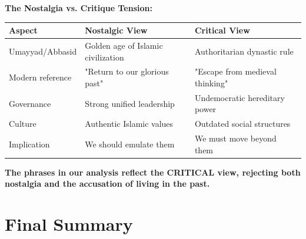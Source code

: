 \documentclass[letterpaper,12pt]{article}
\begin{document}
\begin{tcolorbox}[colback=white,colframe=accentcolor,breakable]
\textbf{The Nostalgia vs. Critique Tension:}

\begin{tabular}{|l|p{5cm}|p{5cm}|}
\hline
\textbf{Aspect} & \textbf{Nostalgic View} & \textbf{Critical View} \\
\hline
Umayyad/Abbasid & Golden age of Islamic civilization & Authoritarian dynastic rule \\
\hline
Modern reference & "Return to our glorious past" & "Escape from medieval thinking" \\
\hline
Governance & Strong unified leadership & Undemocratic hereditary power \\
\hline
Culture & Authentic Islamic values & Outdated social structures \\
\hline
Implication & We should emulate them & We must move beyond them \\
\hline
\end{tabular}

\textbf{The phrases in our analysis reflect the CRITICAL view, rejecting both nostalgia and the accusation of living in the past.}
\end{tcolorbox}

\clearpage

\section{Final Summary}
\end{document}
